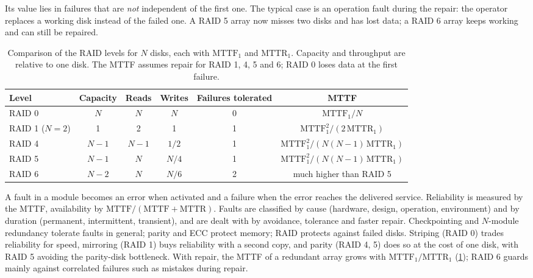 \documentclass[../main.tex]{subfiles}
\begin{document}
Its value lies in failures that are \emph{not} independent of the first
one.
The typical case is an operation fault during the repair: the
operator replaces a working disk instead of the failed one.  A RAID 5 array
now misses two disks and has lost data; a RAID 6 array keeps working and can
still be repaired.

\begin{table}[htbp]
  \centering\small
  \caption{Comparison of the RAID levels for $N$ disks, each with
    $\mathrm{MTTF}_1$ and $\mathrm{MTTR}_1$.  Capacity and throughput are
    relative to one disk.  The MTTF assumes repair for RAID 1, 4, 5 and 6;
    RAID 0 loses data at the first failure.}
  \label{tab:l17-raid}
  \setlength{\tabcolsep}{4pt}
  \begin{tabular}{@{}lccccc@{}}
    \toprule
    Level & Capacity & Reads & Writes & Failures tolerated & MTTF \\
    \midrule
    RAID 0 & $N$   & $N$   & $N$   & 0 & $\mathrm{MTTF}_1/N$ \\
    RAID 1 ($N=2$) & 1 & 2 & 1   & 1 & $\mathrm{MTTF}_1^2/(2\,\mathrm{MTTR}_1)$ \\
    RAID 4 & $N-1$ & $N-1$ & $1/2$ & 1 & $\mathrm{MTTF}_1^2/(N(N-1)\,\mathrm{MTTR}_1)$ \\
    RAID 5 & $N-1$ & $N$   & $N/4$ & 1 & $\mathrm{MTTF}_1^2/(N(N-1)\,\mathrm{MTTR}_1)$ \\
    RAID 6 & $N-2$ & $N$   & $N/6$ & 2 & much higher than RAID 5 \\
    \bottomrule
  \end{tabular}
\end{table}

\begin{keypoint}
  A fault in a module becomes an error when activated and a failure when the
  error reaches the delivered service.  Reliability is measured by the MTTF,
  availability by $\mathrm{MTTF}/(\mathrm{MTTF}+\mathrm{MTTR})$.  Faults are
  classified by cause (hardware, design, operation, environment) and by
  duration (permanent, intermittent, transient), and are dealt with by
  avoidance, tolerance and faster repair.  Checkpointing and $N$-module
  redundancy tolerate faults in general; parity and ECC protect memory; RAID
  protects against failed disks.  Striping (RAID 0) trades reliability for
  speed, mirroring (RAID 1) buys reliability with a second copy, and parity
  (RAID 4, 5) does so at the cost of one disk, with RAID 5 avoiding the
  parity-disk bottleneck.  With repair, the MTTF of a redundant array grows
  with $\mathrm{MTTF}_1/\mathrm{MTTR}_1$ (\cref{tab:l17-raid}); RAID 6 guards
  mainly against correlated failures such as mistakes during repair.
\end{keypoint}
\end{document}
